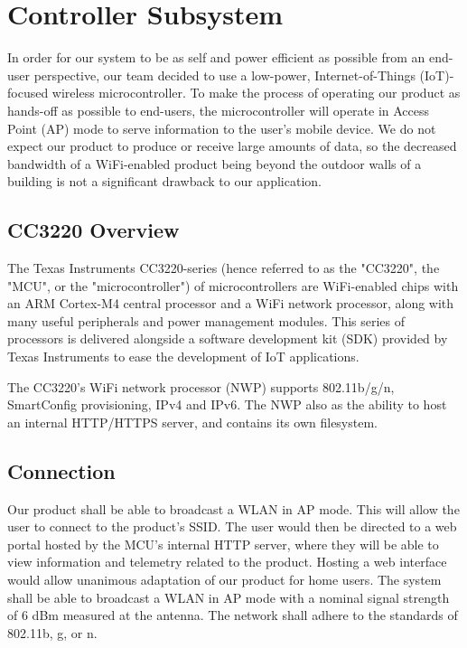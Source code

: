 \section{Controller Subsystem}

In order for our system to be as self and power efficient as possible from an end-user perspective, our team decided to use a low-power, Internet-of-Things (IoT)-focused wireless microcontroller. To make the process of operating our product as hands-off as possible to end-users, the microcontroller will operate in Access Point (AP) mode to serve information to the user's mobile device. We do not expect our product to produce or receive large amounts of data, so the decreased bandwidth of a WiFi-enabled product being beyond the outdoor walls of a building is not a significant drawback to our application.

\subsection{CC3220 Overview}
The Texas Instruments CC3220-series (hence referred to as the "CC3220", the "MCU", or the "microcontroller") of microcontrollers are WiFi-enabled chips with an ARM Cortex-M4 central processor and a WiFi network processor, along with many useful peripherals and power management modules. This series of processors is delivered alongside a software development kit (SDK) provided by Texas Instruments to ease the development of IoT applications.

The CC3220's WiFi network processor (NWP) supports 802.11b/g/n, SmartConfig provisioning, IPv4 and IPv6. The NWP also as the ability to host an internal HTTP/HTTPS server, and contains its own filesystem.

\subsection{Connection}
Our product shall be able to broadcast a WLAN in AP mode. This will allow the user to connect to the product's SSID. The user would then be directed to a web portal hosted by the MCU's internal HTTP server, where they will be able to view information and telemetry related to the product. Hosting a web interface would allow unanimous adaptation of our product for home users. The system shall be able to broadcast a WLAN in AP mode with a nominal signal strength of 6 dBm measured at the antenna. The network shall adhere to the standards of 802.11b, g, or n. 

